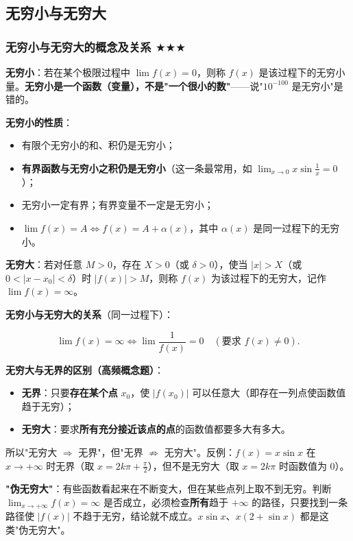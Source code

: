 \documentclass[11pt,openany,UTF8]{ctexbook}
\begin{document}
\subsection{无穷小与无穷大}

\subsubsection{无穷小与无穷大的概念及关系 $\bigstar$$\bigstar$$\bigstar$}

\textbf{无穷小}：若在某个极限过程中 $\lim f(x)=0$，则称 $f(x)$ 是该过程下的无穷小量。\textbf{无穷小是一个函数（变量），不是"一个很小的数"}——说"$10^{-100}$ 是无穷小"是错的。

\textbf{无穷小的性质}：

\begin{itemize}
\item 有限个无穷小的和、积仍是无穷小；
\item \textbf{有界函数与无穷小之积仍是无穷小}（这一条最常用，如 $\lim_{x\to 0}x\sin\frac1x=0$）；
\item 无穷小一定有界；有界变量不一定是无穷小；
\item $\lim f(x)=A \iff f(x)=A+\alpha(x)$，其中 $\alpha(x)$ 是同一过程下的无穷小。
\end{itemize}
\textbf{无穷大}：若对任意 $M>0$，存在 $X>0$（或 $\delta>0$），使当 $\vert x\vert>X$（或 $0<\vert x-x_0\vert<\delta$）时 $\vert f(x)\vert>M$，则称 $f(x)$ 为该过程下的无穷大，记作 $\lim f(x)=\infty$。

\textbf{无穷小与无穷大的关系}（同一过程下）：

\[\lim f(x)=\infty \iff \lim\frac{1}{f(x)}=0\quad(\text{要求 } f(x)\ne 0).\]

\textbf{无穷大与无界的区别（高频概念题）}：

\begin{itemize}
\item \textbf{无界}：只要\textbf{存在某个点} $x_0$，使 $\vert f(x_0)\vert$ 可以任意大（即存在一列点使函数值趋于无穷）；
\item \textbf{无穷大}：要求\textbf{所有充分接近该点的点}的函数值都要多大有多大。
\end{itemize}
所以"无穷大 $\Rightarrow$ 无界"，但"无界 $\not\Rightarrow$ 无穷大"。反例：$f(x)=x\sin x$ 在 $x\to+\infty$ 时无界（取 $x=2k\pi+\frac{\pi}{2}$），但不是无穷大（取 $x=2k\pi$ 时函数值为 $0$）。

\textbf{"伪无穷大"}：有些函数看起来在不断变大，但在某些点列上取不到无穷。判断 $\lim_{x\to+\infty}f(x)=\infty$ 是否成立，必须检查\textbf{所有}趋于 $+\infty$ 的路径，只要找到一条路径使 $\vert f(x)\vert$ 不趋于无穷，结论就不成立。$x\sin x$、$x(2+\sin x)$ 都是这类"伪无穷大"。
\end{document}
